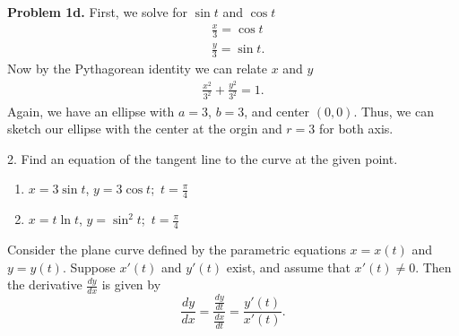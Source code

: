 \documentclass{report}
\begin{document}
    \bigbreak \noindent 
\begin{figure}[ht]
    \centering
    \label{fig:figur}
\end{figure}

    \pagebreak \bigbreak \noindent 
    \textbf{Problem 1d.} First, we solve for $\sin{t}$ and $\cos{t} $
    \begin{align*}
        &\frac{x}{3} = \cos{t} \\
        &\frac{y}{3} = \sin{t}
    .\end{align*}
    Now by the Pythagorean identity we can relate $x$ and $y$
    \begin{align*}
        \frac{x^{2}}{3^{2}} + \frac{y^{2}}{3^{2}} = 1
    .\end{align*}
    \bigbreak \noindent 
    Again, we have an ellipse with $a = 3$, $b=3$, and center $(0,0)$. Thus, we can sketch our ellipse with the center at the orgin and $r=3$ for both axis.
    \bigbreak \noindent 
\begin{figure}[ht]
    \centering
    \label{fig:figmane3}
\end{figure}

    \pagebreak \bigbreak \noindent 
    \begin{mdframed}
        2. Find an equation of the tangent line to the curve at the given point.
        \begin{enumerate}[label=(\alph*)]
            \item $x=3\sin{t}$, $y=3\cos{t}$;\ $t=\frac{\pi}{4}$ 
            \item $x = t\ln{t}$, $y=\sin^{2}{t}$;\ $t=\frac{\pi}{4}$
        \end{enumerate}
    \end{mdframed}
    \bigbreak \noindent 
    \begin{remark}
        Consider the plane curve defined by the parametric equations \( x = x(t) \) and \( y = y(t) \). Suppose \( x'(t) \) and \( y'(t) \) exist, and assume that \( x'(t) \neq 0 \). Then the derivative \( \frac{dy}{dx} \) is given by
        \[
            \frac{dy}{dx} = \frac{\frac{dy}{dt}}{\frac{dx}{dt}} = \frac{y'(t)}{x'(t)}.
        \]
    \end{remark}
    
\end{document}
